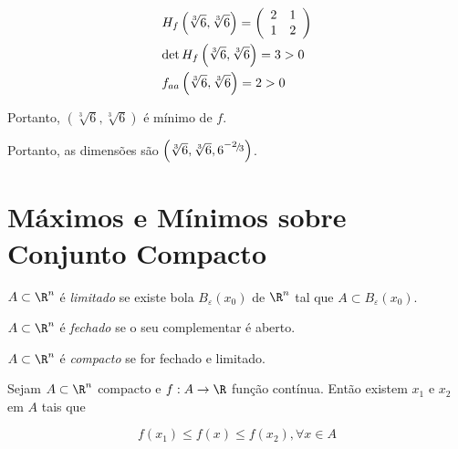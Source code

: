 \documentclass[11pt, oneside, a4paper]{gsm-l}
\begin{document}
\begin{sol}
\[
\begin{gathered}
H_f \left( {\sqrt[3]{6},\sqrt[3]{6}} \right) = \left( {\begin{array}{*{20}c}
2 & 1  \\
1 & 2  \\

\end{array} } \right) \hfill \\
\det H_f \left( {\sqrt[3]{6},\sqrt[3]{6}} \right) = 3 > 0 \hfill \\
f_{aa} \left( {\sqrt[3]{6},\sqrt[3]{6}} \right) = 2 > 0 \hfill \\
\end{gathered}
\]

Portanto, $\left( {\sqrt[3]{6},\sqrt[3]{6}} \right)$ é mínimo de $f$.

    Portanto, as dimensões são $\left( {\sqrt[3]{6},\sqrt[3]{6},6^{{\raise0.5ex\hbox{$\scriptstyle { - 2}$}
\kern-0.1em/\kern-0.15em
\lower0.25ex\hbox{$\scriptstyle 3$}}} } \right)$.
\end{sol}

\section{Máximos e Mínimos sobre Conjunto Compacto} \label{sec22}

\begin{defi}
    $A \subset \R^n$ é \textit{limitado} se existe bola $B_\varepsilon  \left( {x_0 } \right)$ de $\R^n$ tal que $A \subset B_\varepsilon  \left( {x_0 } \right)$.
\end{defi}

\begin{defi}
$A \subset \R^n$ é \textit{fechado} se o seu complementar é aberto.
\end{defi}

\begin{defi}
$A \subset \R^n$ é \textit{compacto} se for fechado e limitado.
\end{defi}

\begin{teo}
    Sejam $A \subset \R^n$ compacto e $f:A \to \R$ função contínua. Então existem $x_1$ e $x_2$ em $A$ tais que

\[
    f\left( {x_1 } \right) \leqslant f\left( x \right) \leqslant f\left( {x_2 } \right),\forall x \in A
\]

\end{teo}
\end{document}
